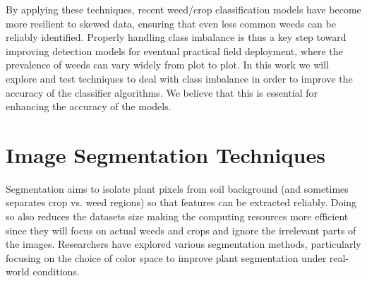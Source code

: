 \documentclass[letterpaper, notitlepage]{report}
\begin{document}
%
%
By applying these techniques, recent weed/crop classification models have become more resilient to skewed data, ensuring that even less common weeds can be reliably identified. Properly handling class imbalance is thus a key step toward improving detection models for eventual practical field deployment, where the prevalence of weeds can vary widely from plot to plot. In this work we will explore and test
techniques to deal with class imbalance in order to improve the accuracy of the classifier algorithms. We believe that this is essential for enhancing the accuracy of the models.

\section{Image Segmentation Techniques}  
Segmentation aims to isolate plant pixels from soil background (and sometimes separates crop vs. weed regions) so that features can be extracted reliably. Doing so also reduces the datasets size making the computing resources more efficient since they will focus on actual weeds and crops and ignore the irrelevant parts of the images. Researchers have explored various segmentation methods, particularly focusing on the choice of color space to improve plant segmentation under real-world conditions.
%
\end{document}
